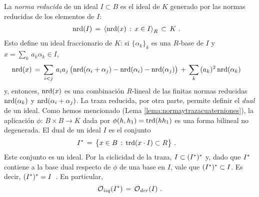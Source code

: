La \emph{norma reducida} de un ideal $I\subset B$
es el ideal de $K$ generado por las normas reducidas de los elementos de $I$:
\begin{align*}
	\nrd(I) & \,=\,\generado[R]{\nrd(x)\,:\,x\in I}\,\subset\,K
	\text{ .}
\end{align*}
%
Esto define un ideal fraccionario de $K$: si $\{\alpha_{k}\}_{k}$ es una
$R$-base de $I$ y $x=\sum_{k}\,a_{k}\alpha_{k}\in I$,
\begin{align*}
	\nrd(x) %
	& \,=\,\sum_{i<j}\,a_{i}a_{j}\,\big(\nrd(\alpha_{i}+\alpha_{j})-
			\nrd(\alpha_{i})-\nrd(\alpha_{j})\big) \,+\,
			\sum_{k}\,(a_{k})^{2}\,\nrd(\alpha_{k})
\end{align*}
%
y, entonces, $\nrd(x)$ es una combinaci\'{o}n $R$-lineal de las finitas normas
reducidas $\nrd(\alpha_{k})$ y $\nrd(\alpha_{i}+\alpha_{j})$. La traza
reducida, por otra parte, permite definir el \emph{dual} de un ideal. Como
hemos mencionado (Lema \ref{lema:normaytrazacuaterniones}), la aplicaci\'{o}n
$\phi:\,B\times B\rightarrow K$ dada por $\phi(h,h_{1})=\trd(hh_{1})$ es una
forma bilineal no degenerada. El dual de un ideal $I$ es el conjunto
\begin{align*}
	\dual{I} & \,=\,\big\{x\in B\,:\,\trd(x\cdot I)\subset R\big\}
	\text{ .}
\end{align*}
%
Este conjunto es un ideal.
Por la ciclicidad de la traza, $I\subset \dual{(\dual{I})}$ y, dado que
$\dual{I}$ contiene a la base dual respecto de $\phi$ de una base en $I$, vale
que $\dual{(\dual{I})}\subset I$. Es decir,
\begin{math}
	\dual{(\dual{I})}=I
\end{math}~.
En particular,
\begin{equation}
	\label{eq:ordendelidealdual}
	\Oizq(\dual{I}) \,=\,\Oder(I)
	\text{ .}
\end{equation}
%

